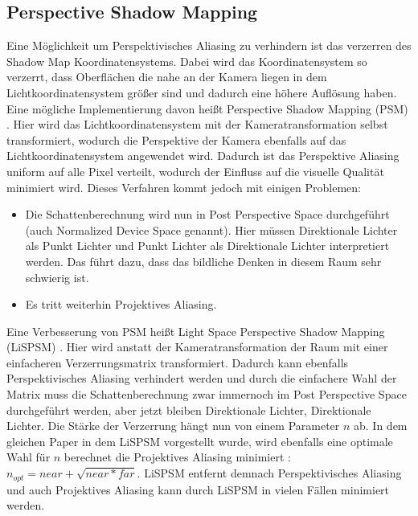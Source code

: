 \subsection{Perspective Shadow Mapping}
\label{section:psm}
Eine Möglichkeit um Perspektivisches Aliasing zu verhindern ist das verzerren 
des Shadow Map Koordinatensystems. 
Dabei wird das Koordinatensystem so verzerrt, dass Oberflächen die nahe an der Kamera liegen in dem
Lichtkoordinatensystem größer sind und dadurch eine höhere Auflösung haben.
Eine mögliche Implementierung davon heißt Perspective Shadow Mapping (PSM) \cite{PSM2002}.
Hier wird das Lichtkoordinatensystem mit der Kameratransformation selbst transformiert, wodurch
die Perspektive der Kamera ebenfalls auf das Lichtkoordinatensystem angewendet wird.
Dadurch ist das Perspektive Aliasing uniform auf alle Pixel verteilt,
wodurch der Einfluss auf die visuelle Qualität minimiert wird.
Dieses Verfahren kommt jedoch mit einigen Problemen:
\begin{itemize}
  \item Die Schattenberechnung wird nun in Post Perspective Space durchgeführt (auch Normalized Device Space genannt).
    Hier müssen Direktionale Lichter als Punkt Lichter und Punkt Lichter als Direktionale Lichter interpretiert werden.
    Das führt dazu, dass das bildliche Denken in diesem Raum sehr schwierig ist.
  \item Es tritt weiterhin Projektives Aliasing.
\end{itemize}
Eine Verbesserung von PSM heißt Light Space Perspective Shadow Mapping (LiSPSM) \cite{LiPSM2004}.
Hier wird anstatt der Kameratransformation der Raum mit einer einfacheren Verzerrungsmatrix transformiert.
Dadurch kann ebenfalls Perspektivisches Aliasing verhindert werden und
durch die einfachere Wahl der Matrix muss die Schattenberechnung zwar immernoch im Post Perspective Space durchgeführt werden,
aber jetzt bleiben Direktionale Lichter, Direktionale Lichter.
Die Stärke der Verzerrung hängt nun von einem Parameter $n$ ab. 
In dem gleichen Paper in dem LiSPSM vorgestellt wurde, wird ebenfalls eine optimale Wahl für $n$ berechnet
die Projektives Aliasing minimiert : $n_{opt} = near + \sqrt{near * far}$.
LiSPSM entfernt demnach Perspektivisches Aliasing und auch Projektives Aliasing kann durch LiSPSM in vielen Fällen
minimiert werden.
